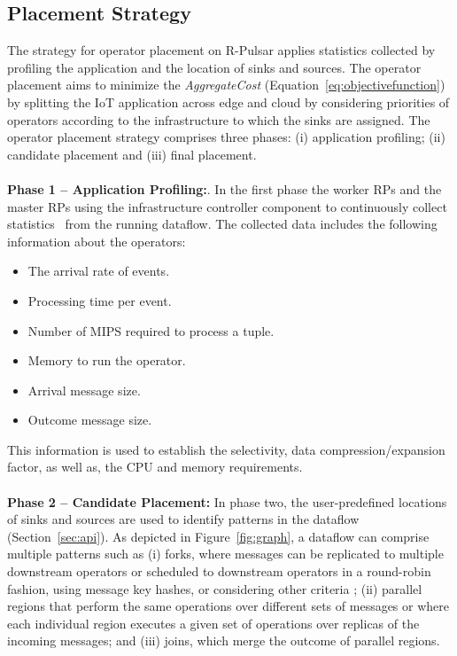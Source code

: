 \subsection{Placement Strategy}\label{sec:strategies}
The strategy for operator placement on R-Pulsar applies statistics collected by profiling the application and the location of sinks and sources. The operator placement aims to minimize the \textit{AggregateCost} (Equation~\ref{eq:objectivefunction}) by splitting the IoT application across edge and cloud by considering priorities of operators according to the infrastructure to which the sinks are assigned.
The operator placement strategy comprises three phases: (i) application profiling; (ii) candidate placement and (iii) final placement. 
\\\\
\noindent\textbf{Phase 1 -- Application Profiling:}. 
In the first phase the worker RPs and the master RPs using the infrastructure controller component to continuously collect statistics~\cite{kaur:2017} from the running dataflow. The collected data includes the following information about the operators:
\begin{itemize}
  \item The arrival rate of events.
  \item Processing time per event.
  \item Number of MIPS required to process a tuple.
  \item Memory to run the operator.
  \item Arrival message size.
  \item Outcome message size.
\end{itemize}
This information is used to establish the selectivity, data compression/expansion factor, as well as, the CPU and memory requirements. 
\\
\\
\textbf{Phase 2 -- Candidate Placement:}
In phase two, the user-predefined locations of sinks and sources are used to identify patterns in the dataflow (Section~\ref{sec:api}). As depicted in Figure~\ref{fig:graph}, a dataflow can comprise multiple patterns such as (i) forks, where messages can be replicated to multiple downstream operators or scheduled to downstream operators in a round-robin fashion, using message key hashes, or considering other criteria \cite{Ni:2017}; (ii) parallel regions that perform the same operations over different sets of messages or where each individual region executes a given set of operations over replicas of the incoming messages; and (iii) joins, which merge the outcome of parallel regions. 

